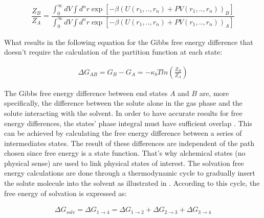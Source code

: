 	\begin{equation}
	\label{eq:partiso}
	\begin{aligned}
	\dfrac{Z_{B}}{Z_{A}} = \dfrac{\int_{0}^{\infty} dV \int d^{n}r \exp \left[ -\beta \left(U(r_{1},..,r_{n}) + PV(r_{1},..,r_{n}) \right)_{B} \right]}{\int_{0}^{\infty} dV \int d^{n}r \exp \left[ -\beta \left(U(r_{1},..,r_{n}) + PV(r_{1},..,r_{n}) \right)_{A} \right]}
	\end{aligned}
	\end{equation}
	
	What results in the following equation for the Gibbs free energy difference that doesn't require the calculation of the partition function at each state:
	
	\begin{equation}
	\label{eq:dif}
	\begin{aligned}
	\Delta G_{AB} = G_{B} - G_{A}= -\kappa_{b}T ln \left( \frac{Z_{B}}{Z_{A}}\right)
	\end{aligned}
	\end{equation}
	
	The Gibbs free energy difference between end states $A$ and $B$ are, more specifically, the difference between the solute alone in the gas phase and the solute interacting with the solvent. In order to have accurate results for free energy differences, the states' phase integral must have sufficient overlap  \cite{klimovich}. This can be achieved by calculating the free energy difference between a series of intermediates states. The result of these differences are independent of the path chosen since free energy is a state function. That's why alchemical states (no physical sense) are used to link physical states of interest. The solvation free energy calculations are done through a thermodynamic cycle to gradually insert the solute molecule into the solvent as illustrated in . According to this cycle, the free energy of solvation is expressed as:
	
	\begin{equation}
	\label{eq:freesolv}
	\begin{aligned}
	\Delta G_{solv} = \Delta G_{1 \rightarrow 4} = \Delta G_{1 \rightarrow 2} + \Delta G_{2 \rightarrow 3} + \Delta G_{3 \rightarrow 4}  
	\end{aligned}
	\end{equation}
	
